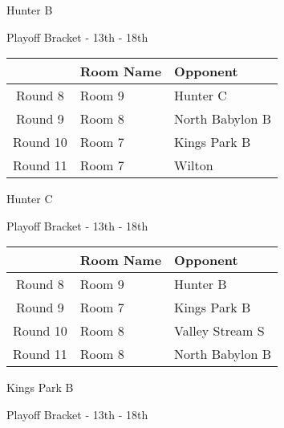 \documentclass{article}%
\begin{document}
\vspace*{80pt}%
\linebreak%
\newpage%
\begin{center}%
\begin{Huge}%
Hunter B%
\end{Huge}%
\vspace*{12pt}%
\linebreak%
\begin{Large}%
Playoff Bracket {-} 13th {-} 18th%
\end{Large}%
\end{center}%
\vspace*{4pt}%
%
\begin{tabularx}{\textwidth}{|c|Y|Y|}%
\hline%
&Room Name&Opponent\\%
\hline%
Round 8&Room 9&Hunter C\\%
Round 9&Room 8&North Babylon B\\%
Round 10&Room 7&Kings Park B\\%
Round 11&Room 7&Wilton\\%
\hline%
\end{tabularx}%
\vspace*{80pt}%
\linebreak%
\newpage%
\begin{center}%
\begin{Huge}%
Hunter C%
\end{Huge}%
\vspace*{12pt}%
\linebreak%
\begin{Large}%
Playoff Bracket {-} 13th {-} 18th%
\end{Large}%
\end{center}%
\vspace*{4pt}%
%
\begin{tabularx}{\textwidth}{|c|Y|Y|}%
\hline%
&Room Name&Opponent\\%
\hline%
Round 8&Room 9&Hunter B\\%
Round 9&Room 7&Kings Park B\\%
Round 10&Room 8&Valley Stream S\\%
Round 11&Room 8&North Babylon B\\%
\hline%
\end{tabularx}%
\vspace*{80pt}%
\linebreak%
\newpage%
\begin{center}%
\begin{Huge}%
Kings Park B%
\end{Huge}%
\vspace*{12pt}%
\linebreak%
\begin{Large}%
Playoff Bracket {-} 13th {-} 18th%
\end{Large}%
\end{center}%
\end{document}

